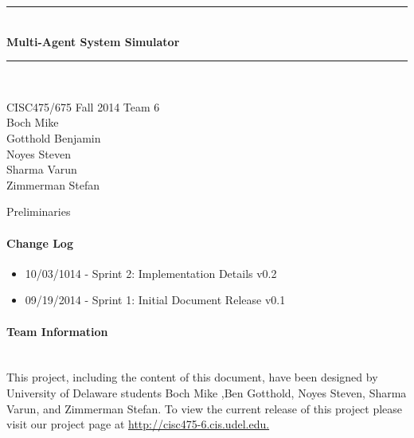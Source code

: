 
\thispagestyle{empty}%


\begin{center}

\vspace*{\fill}
\noindent\rule{13cm}{2pt}\\[0.5cm]
{\huge \bf Multi-Agent System Simulator}
\noindent\rule{13cm}{2pt}\\[1cm]
\vspace*{\fill}
\par CISC475/675 Fall 2014 Team 6 \\
         Boch Mike \\ 
         Gotthold Benjamin \\ 
         Noyes Steven \\ 
         Sharma Varun \\
         Zimmerman Stefan \\






\vfill

\date{\today}

\end{center}



\newpage
{Preliminaries}


\paragraph{Change Log}
\begin{itemize}
\item 10/03/1014 - Sprint 2: Implementation Details v0.2
\item 09/19/2014 - Sprint 1: Initial Document Release v0.1
\end{itemize}


\paragraph{Team Information  \\ \\} 

This project, including the content of this document, have been designed by University of Delaware students Boch Mike ,Ben Gotthold, Noyes Steven, Sharma Varun, and Zimmerman Stefan. To view the current release of this project please visit our project page at \color{black}\url{http://cisc475-6.cis.udel.edu.}